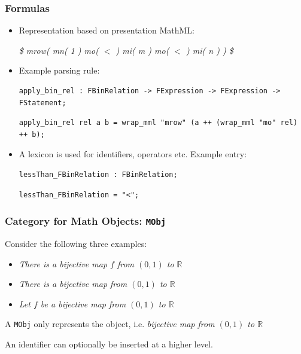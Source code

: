 \documentclass{beamer}
\begin{document}
\begin{frame}[fragile]
    \frametitle{Formulas}
    \begin{itemize}
        \item Representation based on presentation MathML:

            \emph{\$ mrow( mn( 1 ) mo( $<$ ) mi( m ) mo( $<$ ) mi( n ) ) \$}

        \item Example parsing rule:
    
\begin{lstlisting}[language=GF, breaklines=true]
apply_bin_rel : FBinRelation -> FExpression -> FExpression -> FStatement;
\end{lstlisting}

\begin{lstlisting}[language=GF, breaklines=true]
apply_bin_rel rel a b = wrap_mml "mrow" (a ++ (wrap_mml "mo" rel) ++ b);
\end{lstlisting}
        \item A lexicon is used for identifiers, operators etc. Example entry:

\begin{lstlisting}[language=GF, breaklines=true]
lessThan_FBinRelation : FBinRelation;
\end{lstlisting}

\begin{lstlisting}[language=GF, breaklines=true]
lessThan_FBinRelation = "<";
\end{lstlisting}
    \end{itemize}
\end{frame}

\begin{frame}[fragile]
    \frametitle{Category for Math Objects: \lstinline[language=GF]{MObj}}
    Consider the following three examples:
    \begin{itemize}
        \item \emph{There is a bijective map $f$ from $(0, 1)$ to $\mathbb{R}$}
        \item \emph{There is a bijective map from $(0, 1)$ to $\mathbb{R}$}
        \item \emph{Let $f$ be a bijective map from $(0, 1)$ to $\mathbb{R}$}
    \end{itemize}

    A \lstinline[language=GF]{MObj} only represents the object, i.e. \emph{bijective map from $(0, 1)$ to $\mathbb{R}$}

    An identifier can optionally be inserted at a higher level.
\end{frame}
\end{document}
